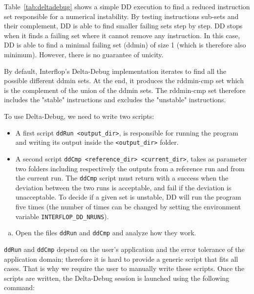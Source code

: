 Table~\ref{tab:deltadebug} shows a simple DD execution to find a reduced
instruction set responsible for a numerical instability. By testing
instructions sub-sets and their complement, DD is able to find smaller failing
sets step by step. DD stops when it finds a failing set where it cannot remove
any instruction. In this case, DD is able to find a minimal failing set (ddmin)
of size 1 (which is therefore also minimum). However, there is no guarantee of unicity.

By default, Interflop's Delta-Debug implementation iterates to find all the
possible different ddmin sets. At the end, it produces the rddmin-cmp set which
is the complement of the union of the ddmin sets. The rddmin-cmp set therefore
includes the "stable" instructions and excludes the "unstable" instructions.

To use Delta-Debug, we need to write two scripts: \begin{itemize}
  \item A first script \texttt{ddRun <output\_dir>}, is responsible for running the program and writing its output inside the \texttt{<output\_dir>} folder.
  \item A second script \texttt{ddCmp <reference\_dir> <current\_dir>}, takes as parameter two folders including respectively the outputs from a reference run and from the current run. The \texttt{ddCmp} script must return with a success when the deviation between the two runs is acceptable, and fail if the deviation is unacceptable.
        To decide if a given set is unstable, DD will run the program five times (the number of times can be changed by setting the environment variable \texttt{INTERFLOP\_DD\_NRUNS}).
\end{itemize}

\begin{question}
  \begin{enumerate}[(a)]
    \item Open the files \texttt{ddRun} and \texttt{ddCmp} and analyze how they work.
  \end{enumerate}
\end{question}

\texttt{ddRun} and \texttt{ddCmp} depend on the user's application and the error tolerance
of the application domain; therefore it is hard to provide a generic script that fits all cases. That is why we require the user to manually write these scripts.
Once the scripts are written, the Delta-Debug session is launched using the following command:

